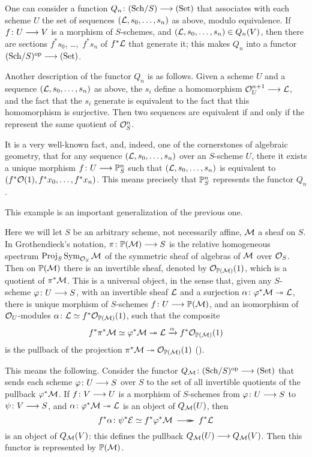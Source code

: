\begin{2   CONTRAVARIANT FUNCTORS}
\begin{2.1 Yoneda Lemma}
\begin{example}
One can consider a function $Q_n \colon \catsch{S} \arr \catset$ that associates with each scheme $U$ the set of sequences $(\mathcal{L}, s_0, \ldots, s_n)$ as above, modulo equivalence. If $f \colon U \arr V$ is a morphism of $S$-schemes, and $(\mathcal{L}, s_0, \ldots, s_n)\in Q_{n}(V)$, then there are sections $f^*s_0$, \dots,~$f^*s_n$ of $f^* \mathcal{L}$ that generate it; this makes $Q_n$ into a functor $\catsch{S}\op \arr \catset$.

Another description of the functor $Q_n$ is as follows. Given a scheme $U$ and a sequence $(\mathcal{L}, s_0, \ldots, s_n)$ as above, the $s_i$ define a homomorphism $\cO_U^{n+1} \arr \cL$, and the fact that the $s_i$ generate is equivalent to the fact that this homomorphism is surjective. Then two sequences are equivalent if and only if the represent the same quotient of $\mathcal{O}_S^n$.

It is a very well-known fact, and, indeed, one of the cornerstones of algebraic geometry, that for any sequence $(\mathcal{L}, s_0, \ldots, s_n)$ over an $S$-scheme $U$, there it exists a unique morphism $f \colon U \arr \PP^n_S$ such that $(\mathcal{L}, s_0, \ldots, s_n)$ is equivalent to $(f^*\mathcal{O}(1), f^*x_0, \ldots, f^*x_n)$. This means precisely that $\mathbb{P}^n_S$ represents the functor $Q_n$.
\end{example}

\begin{example}
This example is an important generalization of the previous one.

Here we will let $S$ be an arbitrary scheme, not necessarily affine, $\mathcal{M}$ a \qc sheaf on $S$. In Grothendieck's notation, $\pi\colon \PP(\cM) \arr S$ is the relative homogeneous spectrum $\operatorname{Proj}_{S}\operatorname{Sym}_{\mathcal{O}_{S}} \mathcal{M}$ of the symmetric sheaf of algebras of $\mathcal{M}$ over $\mathcal{O}_{S}$. Then on $\mathbb{P}(\mathcal{M})$ there is an invertible sheaf, denoted by $\mathcal{O}_{\mathbb{P}(\mathcal{M})}(1)$, which is a quotient of $\pi^{*}\mathcal{M}$. This is a universal object, in the sense that, given any $S$-scheme $\phi\colon U \arr S$, with an invertible sheaf $\mathcal{L}$ and a surjection $\alpha\colon \varphi^{*}\mathcal{M} \twoheadrightarrow \mathcal{L}$, there is unique morphism of $S$-schemes $f\colon U \arr \PP(\cM)$, and an isomorphism of $\mathcal{O}_{U}$-modules $\alpha\colon \mathcal{L} \simeq f^{*}\mathcal{O}_{\mathbb{P}(\mathcal{M})}(1)$, such that the composite
   \[
   f^{*}\pi^{*}\mathcal{M} \simeq \varphi^{*}\mathcal{M} \twoheadrightarrow \mathcal{L}
      \xrightarrow{\alpha} f^{*}\mathcal{O}_{\mathbb{P}(\mathcal{M})}(1)
   \]
is the pullback of the projection $\pi^{*}\mathcal{M} \twoheadrightarrow \mathcal{O}_{\mathbb{P}(\mathcal{M})}(1)$ (\cite[Proposition~4.2.3]{ega1}).

This means the following. Consider the functor $Q_{\cM} \colon \catsch{S}\op \arr \catset$ that sends each scheme $\phi \colon U \arr S$ over $S$ to the set of all invertible quotients of the pullback $\varphi^*\mathcal{M}$. If $f\colon V \arr U$ is a morphism of $S$-schemes from $\phi\colon U \arr S$ to $\psi \colon V \arr S$, and $\alpha\colon \varphi^* \mathcal{M} \twoheadrightarrow \mathcal{L}$ is an object of $Q_{\mathcal{M}}(U)$, then
   \[
   f^*\alpha \colon \psi^* \cE \simeq f^*\phi^* \cM
   \xymatrix@C-5pt{{}\ar@{->>}[r]&{}} f^* \cL
   \]
is an object of $Q_{\mathcal{M}}(V)$: this defines the pullback $Q_{\cM}(U) \arr Q_{\cM}(V)$. Then this functor is represented by $\mathbb{P}(\mathcal{M})$.


\end{example}
\end{2.1 Yoneda Lemma}
\end{2   CONTRAVARIANT FUNCTORS}
